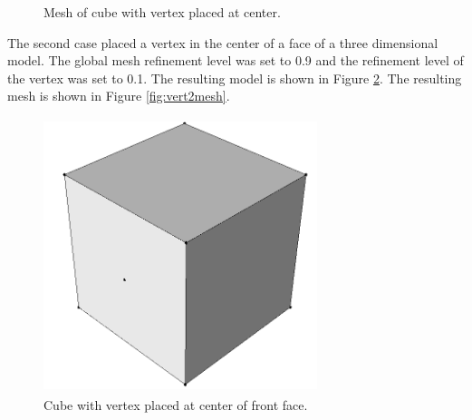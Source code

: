 \documentclass[a4paper, 12pt]{article}
\begin{document}
\begin{figure}[H]
  \centering
  \caption{Mesh of cube with vertex placed at center.}
  \label{fig:vert1mesh}
\end{figure}

The second case placed a vertex in the center of a face of 
a three dimensional 
model. The global mesh refinement level was set to 0.9 and the refinement
level of the vertex was set to 0.1. 
The resulting model is shown in Figure \ref{fig:vert2model}.
The resulting mesh is shown in Figure \ref{fig:vert2mesh}.

\begin{figure}[H]
  \centering
  \includegraphics[width=8cm, height=8cm]{test4_smd}
  \caption{Cube with vertex placed at center of front face.}
  \label{fig:vert2model}
\end{figure}
\end{document}

